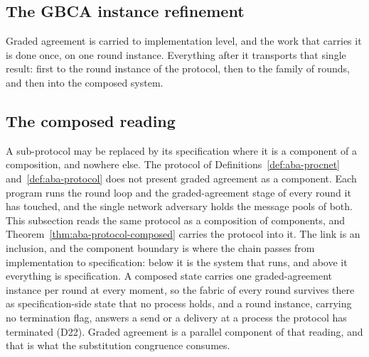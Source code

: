 \subsection{The GBCA instance refinement}

Graded agreement is carried to implementation level, and the work that carries
it is done once, on one round instance.
Everything after it transports that single result: first to the round instance
of the protocol, then to the family of rounds, and then into the composed
system.




\subsection{The composed reading}

A sub-protocol may be replaced by its specification where it is a component of
a composition, and nowhere else.
The protocol of Definitions~\ref{def:aba-procnet}
and~\ref{def:aba-protocol} does not present graded agreement as a component.
Each program runs the round loop and the graded-agreement stage of every round
it has touched, and the single network adversary holds the message pools of
both.
This subsection reads the same protocol as a composition of components, and
Theorem~\ref{thm:aba-protocol-composed} carries the protocol into it.
The link is an inclusion, and the component boundary is where the chain passes
from implementation to specification: below it is the system that runs,
and above it everything is specification.
A composed state carries one graded-agreement instance per round at every
moment, so the fabric of every round survives there as specification-side state
that no process holds, and a round instance, carrying no termination flag,
answers a send or a delivery at a process the protocol has terminated (D22).
Graded agreement is a parallel component of that reading, and that is what the
substitution congruence consumes.

